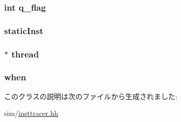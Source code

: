 \label{classTrace_1_1InstRecord_afbb4c93008d44e809c143bbe5021d16e}
\hypertarget{classTrace_1_1InstRecord_abdd3d802d4b2f522680593959ae85a8e}{
\subsubsection[{q\_\-flag}]{\setlength{\rightskip}{0pt plus 5cm}int {\bf q\_\-flag}}}
\label{classTrace_1_1InstRecord_abdd3d802d4b2f522680593959ae85a8e}
\hypertarget{classTrace_1_1InstRecord_a6799d48af805bf0bd72441e882589a6a}{
\subsubsection[{staticInst}]{ {\bf staticInst}}}
\label{classTrace_1_1InstRecord_a6799d48af805bf0bd72441e882589a6a}
\hypertarget{classTrace_1_1InstRecord_a8042f727312ecdee2058de43eafc6a74}{
\subsubsection[{thread}]{$\ast$ {\bf thread}}}
\label{classTrace_1_1InstRecord_a8042f727312ecdee2058de43eafc6a74}
\hypertarget{classTrace_1_1InstRecord_a4205d107172cd4b1d39ec6103ee0af75}{
\subsubsection[{when}]{ {\bf when}}}
\label{classTrace_1_1InstRecord_a4205d107172cd4b1d39ec6103ee0af75}


このクラスの説明は次のファイルから生成されました:\begin{DoxyCompactItemize}
\item 
sim/\hyperlink{insttracer_8hh}{insttracer.hh}\end{DoxyCompactItemize}
